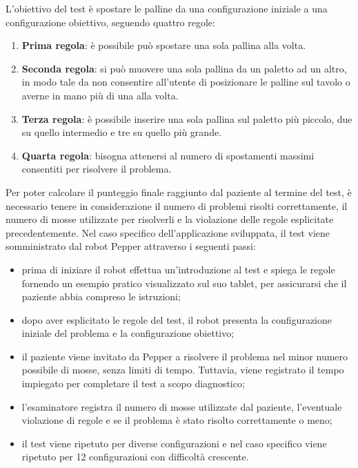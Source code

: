 \begin{sloppypar}
{L’obiettivo del test è spostare le palline da una configurazione iniziale a una
configurazione obiettivo, seguendo quattro regole:
\begin{enumerate}
    \item \textbf{Prima regola}: è possibile può spostare una sola pallina alla volta.
    \vspace{0.15cm}
    \item \textbf{Seconda regola}: si può muovere una sola pallina da un paletto ad un altro, in modo tale da non consentire all’utente di posizionare le palline sul tavolo o averne in mano più di una alla volta.
\vspace{0.4cm}
\item \textbf{Terza regola}: è possibile inserire una sola pallina sul paletto più
piccolo, due su quello intermedio e tre su quello più grande.
\vspace{0.4cm}
\item \textbf{Quarta regola}: bisogna attenersi al numero di spostamenti massimi consentiti
per risolvere il problema.
\end{enumerate}
\vspace{0.8cm}
Per poter calcolare il punteggio finale raggiunto dal paziente al termine del test, è
necessario tenere in considerazione il numero di problemi risolti correttamente, il
numero di mosse utilizzate per risolverli e la violazione delle regole
esplicitate precedentemente.\newline
Nel caso specifico dell’applicazione sviluppata, il test viene somministrato
dal robot Pepper attraverso i seguenti passi:
\begin{itemize}
    \item prima di iniziare il robot effettua un'introduzione al test e spiega le
regole fornendo un esempio pratico visualizzato sul suo tablet,
per assicurarsi che il paziente abbia compreso le istruzioni;
\vspace{0.4cm}
    \item dopo aver esplicitato le regole del test, il robot presenta la configurazione
iniziale del problema e la configurazione obiettivo;
\vspace{0.4cm}
    \item il paziente viene invitato da Pepper a risolvere il problema nel minor numero
possibile di mosse, senza limiti di tempo. Tuttavia, viene registrato il tempo
impiegato per completare il test a scopo diagnostico;
\vspace{0.4cm}
    \item l’esaminatore registra il numero di mosse utilizzate dal paziente, l’eventuale
violazione di regole e se il problema è stato risolto correttamente o meno;
\vspace{0.4cm}
    \item il test viene ripetuto per diverse configurazioni e nel caso specifico viene
ripetuto per 12 configurazioni con difficoltà crescente.
\end{itemize}

}
\end{sloppypar}
